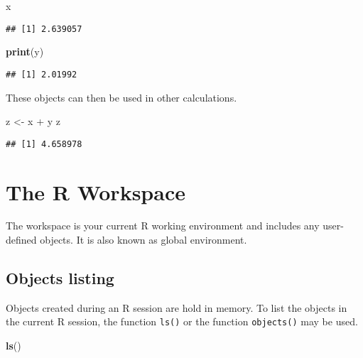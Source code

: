 \documentclass[]{book}
\newenvironment{Shaded}{\begin{snugshade}}{\end{snugshade}}
\newcommand{\KeywordTok}[1]{\textcolor[rgb]{0.13,0.29,0.53}{\textbf{{#1}}}}
\newcommand{\StringTok}[1]{\textcolor[rgb]{0.31,0.60,0.02}{{#1}}}
\newcommand{\NormalTok}[1]{{#1}}
\begin{document}
\begin{Shaded}
\begin{Highlighting}[]
\NormalTok{x}
\end{Highlighting}
\end{Shaded}

\begin{verbatim}
## [1] 2.639057
\end{verbatim}

\begin{Shaded}
\begin{Highlighting}[]
\KeywordTok{print}\NormalTok{(y)}
\end{Highlighting}
\end{Shaded}

\begin{verbatim}
## [1] 2.01992
\end{verbatim}

These objects can then be used in other calculations.

\begin{Shaded}
\begin{Highlighting}[]
\NormalTok{z <-}\StringTok{ }\NormalTok{x +}\StringTok{ }\NormalTok{y}
\NormalTok{z}
\end{Highlighting}
\end{Shaded}

\begin{verbatim}
## [1] 4.658978
\end{verbatim}

\section{The R Workspace}\label{the-r-workspace}

The workspace is your current R working environment and includes any
user-defined objects. It is also known as global environment.

\subsection{Objects listing}\label{objects-listing}

Objects created during an R session are hold in memory. To list the
objects in the current R session, the function \texttt{ls()} or the
function \texttt{objects()} may be used.

\begin{Shaded}
\begin{Highlighting}[]
\KeywordTok{ls}\NormalTok{()}
\end{Highlighting}
\end{Shaded}
\end{document}
